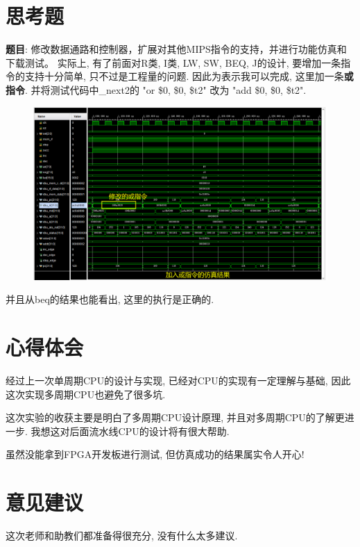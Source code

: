 \documentclass[UTF8]{article}
\begin{document}
\section{思考题}
\noindent
\textbf{题目}: 修改数据通路和控制器，扩展对其他MIPS指令的支持，并进行功能仿真和下载测试。
实际上, 有了前面对R类, I类, LW, SW, BEQ, J的设计, 要增加一条指令的支持十分简单, 只不过是工程量的问题. 因此为表示我可以完成, 这里加一条\textbf{或指令}. 并将测试代码中\_next2的 "or \$0, \$0, \$t2" 改为 "add \$0, \$0, \$t2".
\begin{figure}[H]
	\centering
	\includegraphics[width=\linewidth]{CPU_OR.png}
\end{figure}
并且从beq的结果也能看出, 这里的执行是正确的.

\section{心得体会}
经过上一次单周期CPU的设计与实现, 已经对CPU的实现有一定理解与基础, 因此这次实现多周期CPU也避免了很多坑.\par
这次实验的收获主要是明白了多周期CPU设计原理, 并且对多周期CPU的了解更进一步. 我想这对后面流水线CPU的设计将有很大帮助.\par
虽然没能拿到FPGA开发板进行测试, 但仿真成功的结果属实令人开心!\par

\section{意见建议}
这次老师和助教们都准备得很充分, 没有什么太多建议.\par
\end{document}
